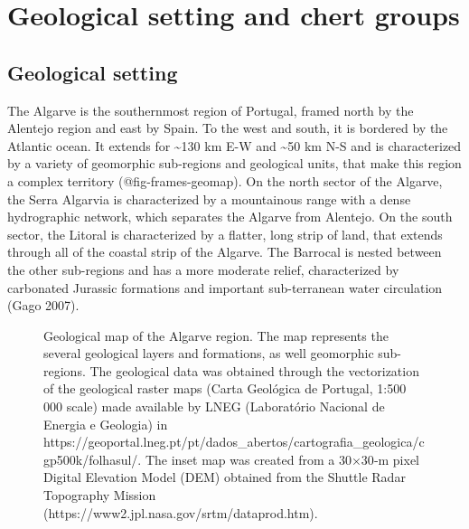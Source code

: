 \documentclass[
  a4paper,
  DIV=11,
  numbers=noendperiod]{scrreprt}
\begin{document}
\section{Geological setting and chert
groups}\label{geological-setting-and-chert-groups}

\subsection{Geological setting}\label{geological-setting}

The Algarve is the southernmost region of Portugal, framed north by the
Alentejo region and east by Spain. To the west and south, it is bordered
by the Atlantic ocean. It extends for \textasciitilde130 km E-W and
\textasciitilde50 km N-S and is characterized by a variety of geomorphic
sub-regions and geological units, that make this region a complex
territory (@fig-frames-geomap). On the north sector of the Algarve, the
Serra Algarvia is characterized by a mountainous range with a dense
hydrographic network, which separates the Algarve from Alentejo. On the
south sector, the Litoral is characterized by a flatter, long strip of
land, that extends through all of the coastal strip of the Algarve. The
Barrocal is nested between the other sub-regions and has a more moderate
relief, characterized by carbonated Jurassic formations and important
sub-terranean water circulation (Gago 2007).

\begin{figure}


\caption{\label{fig-frames-geomap}Geological map of the Algarve region.
The map represents the several geological layers and formations, as well
geomorphic sub-regions. The geological data was obtained through the
vectorization of the geological raster maps (Carta Geológica de
Portugal, 1:500 000 scale) made available by LNEG (Laboratório Nacional
de Energia e Geologia) in
https://geoportal.lneg.pt/pt/dados\_abertos/cartografia\_geologica/cgp500k/folhasul/.
The inset map was created from a 30×30‐m pixel Digital Elevation Model
(DEM) obtained from the Shuttle Radar Topography Mission
(https://www2.jpl.nasa.gov/srtm/dataprod.htm).}

\end{figure}%
\end{document}
